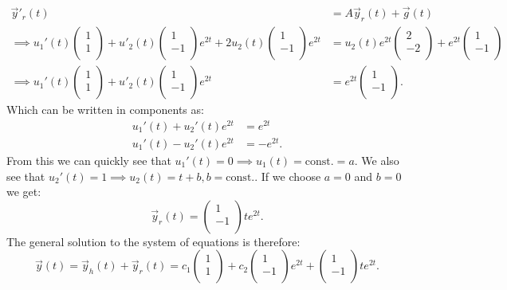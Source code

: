 \begin{align*}
  \Vec{y}'_r(t) &= A \Vec{y}_r(t) + \Vec{g}(t) \\
  \implies u_1'(t) \begin{pmatrix}
  1\\
  1\\
  \end{pmatrix} + u'_2(t) \begin{pmatrix}
  1\\
  -1\\
  \end{pmatrix} e^{2t} + 2 u_2(t) \begin{pmatrix}
  1\\
  -1\\
  \end{pmatrix} e^{2t} &= u_2 (t) e^{2t} \begin{pmatrix}
  2\\
  -2\\
  \end{pmatrix} + e^{2t} \begin{pmatrix}
  1\\
  -1\\
  \end{pmatrix} \\
  \implies u_1'(t) \begin{pmatrix}
  1\\
  1\\
  \end{pmatrix} + u'_2(t) \begin{pmatrix}
  1\\
  -1\\
  \end{pmatrix} e^{2t} &= e^{2t} \begin{pmatrix}
  1\\
  -1\\
  \end{pmatrix}
.\end{align*}
Which can be written in components as:
\begin{align*}
  u_1'(t) + u_2'(t) e^{2t} &= e^{2t} \\
  u_1'(t) - u_2'(t) e^{2t} &= - e^{2t}
.\end{align*}
From this we can quickly see that $u_1'(t) = 0 \implies u_1(t) = \mathrm{const.} = a$. We also see that $u_2'(t) = 1 \implies u_2(t) = t + b, b = \mathrm{const.}$. If we choose $a = 0$ and $b = 0$ we get:
\[ 
\Vec{y}_r(t) = \begin{pmatrix}
1\\
-1\\
\end{pmatrix} t e^{2t}
.\]
The general solution to the system of equations is therefore:
\[ 
\Vec{y}(t) = \Vec{y}_h(t) + \Vec{y}_r(t) = c_1 \begin{pmatrix}
1\\
1\\
\end{pmatrix} + c_2 \begin{pmatrix}
1\\
-1\\
\end{pmatrix} e^{2t} + \begin{pmatrix}
1\\
-1\\
\end{pmatrix} t e^{2t}
.\]





